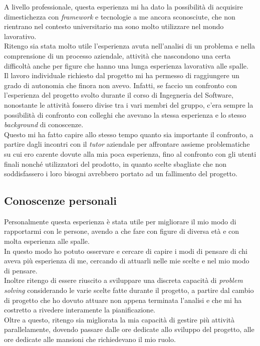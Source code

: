 A livello professionale, questa esperienza mi ha dato la possibilità di acquisire dimestichezza con \textit{framework} e tecnologie a me ancora sconosciute, che non rientrano nel contesto universitario ma sono molto utilizzare nel mondo lavorativo.\\
Ritengo sia stata molto utile l'esperienza avuta nell'analisi di un problema e nella comprensione di un processo aziendale, attività che nascondono una certa difficoltà anche per figure che hanno una lunga esperienza lavorativa alle spalle.\\
Il lavoro individuale richiesto dal progetto mi ha permesso di raggiungere un grado di autonomia che finora non avevo. Infatti, se faccio un confronto con l'esperienza del progetto svolto durante il corso di Ingegneria del Software, nonostante le attività fossero divise tra i vari membri del gruppo, c'era sempre la possibilità di confronto con colleghi che avevano la stessa esperienza e lo stesso \textit{background} di conoscenze.\\
Questo mi ha fatto capire allo stesso tempo quanto sia importante il confronto, a partire dagli incontri con il \textit{tutor} aziendale per affrontare assieme problematiche su cui ero carente dovute alla mia poca esperienza, fino al confronto con gli utenti finali nonché utilizzatori del prodotto, in quanto scelte sbagliate che non soddisfassero i loro bisogni avrebbero portato ad un fallimento del progetto.



\subsection{Conoscenze personali}

Personalmente questa esperienza è stata utile per migliorare il mio modo di rapportarmi con le persone, avendo a che fare con figure di diversa età e con molta esperienza alle spalle.\\
In questo modo ho potuto osservare e cercare di capire i modi di pensare di chi aveva più esperienza di me, cercando di attuarli nelle mie scelte e nel mio modo di pensare.\\
Inoltre ritengo di essere riuscito a sviluppare una discreta capacità di \textit{problem solving} considerando le varie scelte fatte durante il progetto, a partire dal cambio di progetto che ho dovuto attuare non appena terminata l'analisi e che mi ha costretto a rivedere interamente la pianificazione.\\
Oltre a questo, ritengo sia migliorata la mia capacità di gestire più attività parallelamente, dovendo passare dalle ore dedicate allo sviluppo del progetto, alle ore dedicate alle mansioni che richiedevano il mio ruolo.\\

